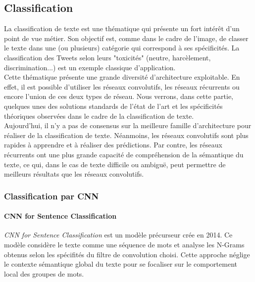 \subsection{Classification}
La classification de texte est une thématique qui présente un fort intérêt d'un point de vue métier. Son objectif est, comme dans le cadre de l'image, de classer le texte dans une (ou plusieurs) catégorie qui correspond à ses spécificités. La classification des Tweets selon leurs "toxicités" (neutre, harcèlement, discrimination...) est un exemple classique d'application.\\

\noindent Cette thématique présente une grande diversité d'architecture exploitable. En effet, il est possible d'utiliser les réseaux convolutifs, les réseaux récurrents ou encore l'union de ces deux types de réseau. Nous verrons, dans cette partie, quelques unes des solutions standards de l'état de l'art et les spécificités théoriques observées dans le cadre de la classification de texte.\\

\noindent Aujourd'hui, il n'y a pas de consensus sur la meilleure famille d'architecture pour réaliser de la classification de texte. Néanmoins, les réseaux convolutifs sont plus rapides à apprendre et à réaliser des prédictions. Par contre, les réseaux récurrents ont une plus grande capacité de compréhension de la sémantique du texte, ce qui, dans le cas de texte difficile ou ambiguë, peut permettre de meilleurs résultats que les réseaux convolutifs.

\subsubsection{Classification par CNN}
\paragraph{CNN for Sentence Classification}
\textit{CNN for Sentence Classification}\cite{cnntxt1} est un modèle précurseur crée en 2014. Ce modèle considère le texte comme une séquence de mots et analyse les N-Grams obtenus selon les spécifités du filtre de convolution choisi. Cette approche néglige le contexte sémantique global du texte pour se focaliser sur le comportement local des groupes de mots.\\

